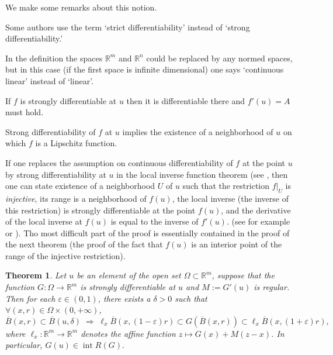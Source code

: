 \documentclass{article}
\newtheorem{theorem}{Theorem}
\newcommand{\ir}{\mathop{\mathrm{int}}\nolimits}
\newcommand{\R}{\ensuremath{\mathbb R}}
\newcommand{\ee}{\varepsilon}
\newcommand{\dd}{\delta}
\newcommand{\ol}{\overline}
\begin{document}
We make some remarks about this notion.

Some authors use the term `strict differentiability' instead of
`strong diffe\-rentiability.'

In the definition the spaces $ \R^m $ and $ \R^n $ could be
replaced by any normed spaces, but in this case (if the first
space is infinite dimensional) one says `continuous linear'
instead of `linear'.

If $f$ is strongly differentiable at $ u $ then it is differentiable there and
$f'(u)=A $ must hold.

Strong differentiability of $ f $ at $ u $ implies the existence of a neighborhood
of $ u $ on which $ f $ is a Lipschitz function.

If one replaces the assumption on continuous differentiability of
$f$ at the point $ u $ by strong differentiability at $u$ in the
local inverse function theorem (see \cite{Graves:27}, then one can
state existence of a neighborhood $U$ of $u$ such that the
restriction $f|_U$ is \emph{injective}, its range is a
neighborhood of $ f(u) $, the local inverse (the inverse of this
restriction) is strongly differentiable at the point $f(u) $, and
the derivative of the local inverse at $f(u)$ is equal to the
inverse of $f'(u)$. (see for example \cite{Leach:61} or
\cite{Leach:63}). Tho most difficult part of the proof is essentially contained in
the proof of the next theorem (the proof of the fact that $f(u)$ is an interior point of the range of the injective restriction).

\begin{theorem}\label{invfunthe}
Let $u$ be an element of the open set $\Omega\subset\R^m$, suppose
that the function $G:\Omega\to\R^m$ is strongly differentiable at
$u$ and $M:=G'(u)$ is regular. Then for each $\ee\in(0,1)$, there
exists a $\dd>0$ such that
$\forall(x,r)\in\Omega\times(0,+\infty)$,
\[ \ol{B}(x,r)\subset\ol{B}(u,\delta)\;
\Longrightarrow\;\ell_x\ol{B}(x,(1-\ee)r)\subset G(\ol{B}(x,r))
\subset\ell_x\ol{B}(x,(1+\ee)r),\] where $\ell_x:\R^m\to\R^m$
denotes the affine function $z\mapsto G(x)+M(z-x)$. In particular,
$G(u)\in\ir R(G).$
\end{theorem}
\end{document}
